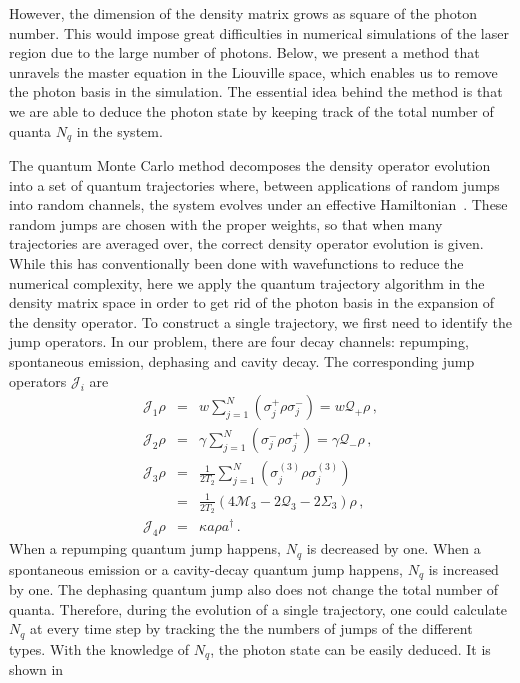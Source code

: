 \documentclass[aps,
twocolumn,
showpacs,
superscriptaddress,groupedaddress]{revtex4}
\begin{document}
However, the dimension of the density matrix grows as square of
the photon number.  This would impose great difficulties in numerical
simulations of the laser region due to the large number of photons.
Below, we present a method that unravels the master equation in the
Liouville space, which enables us to remove the photon basis in the
simulation. The essential idea behind the method is that we are able to
deduce the photon state by keeping track of the total number of quanta
$N_q$ in the system.

The quantum Monte Carlo method decomposes the density operator evolution
into a set of quantum trajectories where, between applications of random
jumps into random channels, the system evolves under an effective
Hamiltonian~\cite{Dalibard92,Dum92,Knight98}. These random jumps are chosen with the proper weights, so that when many trajectories are averaged over, the correct density operator evolution is given. While this has
conventionally been done with wavefunctions to reduce the numerical
complexity, here we apply the quantum trajectory algorithm in the
density matrix space in order to get rid of the photon basis in the
expansion of the density operator. To construct a single trajectory, we
first need to identify the jump operators. In our problem, there are
four decay channels: repumping, spontaneous emission, dephasing and
cavity decay. The corresponding jump operators $\mathcal{J}_i$ are
\begin{eqnarray}
\mathcal{J}_1\rho&=&
w\sum_{j=1}^N(\sigma_j^+\rho\sigma_j^-)=w\mathcal{Q}_{+}\rho\,,
\nonumber\\
\mathcal{J}_2\rho&=&
\gamma\sum_{j=1}^N(\sigma_j^-\rho\sigma_j^+)=
\gamma \mathcal{Q}_{-}\rho\,,\nonumber\\
\mathcal{J}_3\rho&=&
\frac{1}{2T_2}\sum_{j=1}^N(\sigma_j^{(3)}\rho\sigma_j^{(3)})
\nonumber\\
&=&\frac{1}{2T_2}(4\mathcal{M}_3-2  \mathcal{Q}_3-2\Sigma_3)\rho\,,
\nonumber\\
\mathcal{J}_4\rho&=&\kappa a\rho a^{\dagger}\,.
\label{jumpo}
\end{eqnarray}
When a repumping quantum jump happens, $N_q$ is decreased by one. When a
spontaneous emission or a cavity-decay quantum jump happens, $N_q$ is
increased by one. The dephasing quantum jump also does not change the
total number of quanta. Therefore, during the evolution of a single
trajectory, one could calculate $N_q$ at every time step by tracking the
the numbers of jumps of the different types. With the knowledge of
$N_q$, the photon state can be easily deduced. It is shown in
\end{document}
